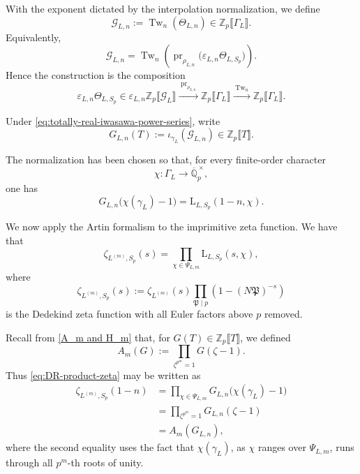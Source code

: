 \documentclass[11pt,table]{amsart}
\numberwithin{equation}{section}
\begin{document}
With the exponent dictated by the interpolation normalization, we define
\begin{equation}
\label{eq:DR-relative-Iwasawa-element}
        \mathscr G_{L,n}
        :=
        \operatorname{Tw}_n(\Theta_{L,n})
        \in
        \mathbb Z_p\llbracket\Gamma_L\rrbracket.
\end{equation}
Equivalently,
\[
        \mathscr G_{L,n}
        =
        \operatorname{Tw}_n
        \left(
        \operatorname{pr}_{\rho_{L,n}}
        \bigl(\varepsilon_{L,n}\Theta_{L,S_p}\bigr)
        \right).
\]
Hence the construction is the composition
\[
        \varepsilon_{L,n}\Theta_{L,S_p}
        \in
        \varepsilon_{L,n}\mathbb Z_p\llbracket\mathcal G_L\rrbracket
        \xrightarrow{\;\operatorname{pr}_{\rho_{L,n}}\;}
        \mathbb Z_p\llbracket\Gamma_L\rrbracket
        \xrightarrow{\;\operatorname{Tw}_n\;}
        \mathbb Z_p\llbracket\Gamma_L\rrbracket.
\]

Under
\eqref{eq:totally-real-iwasawa-power-series}, write
\begin{equation}\label{GLn}G_{L,n}(T)
        :=
        \iota_{\gamma_L}(\mathscr G_{L,n})
        \in
        \mathbb Z_p\llbracket T\rrbracket.
\end{equation}

The normalization has been chosen so that, for every finite-order
character
\[
        \chi:\Gamma_L
        \longrightarrow
        \overline{\mathbb Q}_p^{\,\times},
\]
one has
\begin{equation}
\label{eq:DR-relative-interpolation}
        G_{L,n}
        \bigl(\chi(\gamma_L)-1\bigr)
        =
        \mathrm{L}_{L,S_p}(1-n,\chi).
\end{equation}
\par We now apply the Artin formalism to the imprimitive zeta function. We have that
\begin{equation}
\label{eq:Artin-totally-real-p-depleted}
        \zeta_{L^{(m)},S_p}(s)
        =
        \prod_{\chi\in\Psi_{L,m}}
        \mathrm{L}_{L,S_p}(s,\chi),
\end{equation}
where
\[
        \zeta_{L^{(m)},S_p}(s)
        :=
        \zeta_{L^{(m)}}(s)
        \prod_{\mathfrak P\mid p}
        \left(
        1-(N\mathfrak P)^{-s}
        \right)
\]
is the Dedekind zeta function with all Euler factors above \(p\) removed.

Recall from \eqref{A_m and H_m} that, for
\(G(T)\in\mathbb Z_p\llbracket T\rrbracket\), we defined
\[
        A_m(G)
        :=
        \prod_{\zeta^{p^m}=1}G(\zeta-1).
\]
Thus \eqref{eq:DR-product-zeta} may be written as
\begin{equation}
\label{eq:DR-product-zeta}
\begin{aligned}
        \zeta_{L^{(m)},S_p}(1-n)
        &=
        \prod_{\chi\in\Psi_{L,m}}
        G_{L,n}\bigl(\chi(\gamma_L)-1\bigr)\\
        &=
        \prod_{\zeta^{p^m}=1}G_{L,n}(\zeta-1)\\
        &=
        A_m(G_{L,n}),
\end{aligned}
\end{equation}
where the second equality uses the fact that
\(\chi(\gamma_L)\), as \(\chi\) ranges over \(\Psi_{L,m}\), runs through
all \(p^m\)-th roots of unity.
\end{document}
